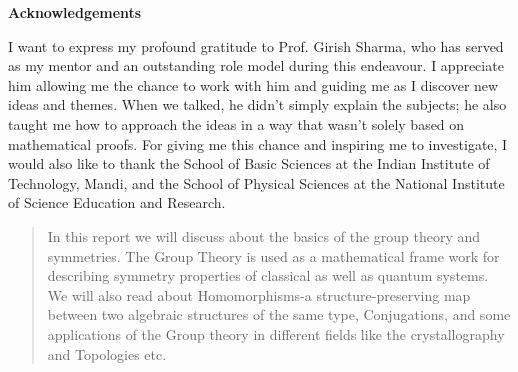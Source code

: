 \documentclass{article}
\begin{document}

\restoregeometry


\cleardoublepage
\begin{center}
    \Large{\textbf{Acknowledgements}}
\end{center}

\vspace{0.2in}
I want to express my profound gratitude to Prof. Girish Sharma, who has served as my mentor and an outstanding role model during this endeavour. I appreciate him allowing me the chance to work with him and guiding me as I discover new ideas and themes. When we talked, he didn't simply explain the subjects; he also taught me how to approach the ideas in a way that wasn't solely based on mathematical proofs. For giving me this chance and inspiring me to investigate, I would also like to thank the School of Basic Sciences at the Indian Institute of Technology, Mandi, and the School of Physical Sciences at the National Institute of Science Education and Research.

\newpage
\restoregeometry







\restoregeometry



\begin{abstract}
    In this report we will discuss about the basics of the group theory and symmetries.
    The Group Theory is used as a mathematical frame work for describing symmetry properties 
    of classical as well as quantum systems. We will also read about Homomorphisms-a 
    structure-preserving map between two algebraic structures of the same type, 
    Conjugations, and some applications of the Group theory in different fields 
    like the crystallography and Topologies etc. 
    \end{abstract}
\restoregeometry
\end{document}
